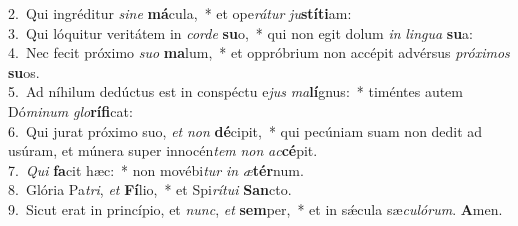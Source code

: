 {2.~}Qui ingréditur \textit{si}\textit{ne} \textbf{má}cula,~* et ope\textit{rá}\textit{tur} \textit{ju}\textbf{stí}\textbf{ti}am:\\
{3.~}Qui lóquitur veritátem in \textit{cor}\textit{de} \textbf{su}o,~* qui non egit dolum \textit{in} \textit{lin}\textit{gua} \textbf{su}a:\\
{4.~}Nec fecit próximo \textit{su}\textit{o} \textbf{ma}lum,~* et oppróbrium non accépit advérsus \textit{pró}\textit{xi}\textit{mos} \textbf{su}os.\\
{5.~}Ad níhilum dedúctus est in conspéctu e\textit{jus} \textit{ma}\textbf{lí}gnus:~* timéntes autem Dó\textit{mi}\textit{num} \textit{glo}\textbf{rí}\textbf{fi}cat:\\
{6.~}Qui jurat próximo suo, \textit{et} \textit{non} \textbf{dé}cipit,~* qui pecúniam suam non dedit ad usúram, et múnera super innocén\textit{tem} \textit{non} \textit{ac}\textbf{cé}pit.\\
{7.~}\textit{Qui} \textbf{fa}cit hæc:~* non movébi\textit{tur} \textit{in} \textit{æ}\textbf{tér}num.\\
{8.~}Glória Pa\textit{tri}, \textit{et} \textbf{Fí}lio,~* et Spi\textit{rí}\textit{tu}\textit{i} \textbf{San}cto.\\
{9.~}Sicut erat in princípio, et \textit{nunc}, \textit{et} \textbf{sem}per,~* et in sǽcula sæ\textit{cu}\textit{ló}\textit{rum}. \textbf{A}men.\\
